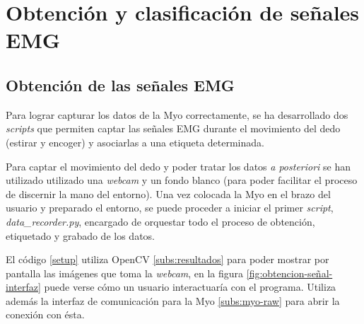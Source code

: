 
\chapter{Obtención y clasificación de señales EMG} %

\label{Chapter4} %







%
%
%
%

\section{Obtención de las señales EMG}
\label{sec:obtención-señales}
Para lograr capturar los datos de la Myo correctamente, se ha desarrollado dos \textit{scripts}
que permiten captar las señales EMG durante el movimiento del dedo (estirar y encoger) y
asociarlas a una etiqueta determinada.

Para captar el movimiento del dedo y poder tratar los datos \textit{a posteriori} se han utilizado
utilizado una \textit{webcam} y un fondo blanco (para poder facilitar el proceso de discernir la
mano del entorno). Una vez colocada la Myo en el brazo del usuario y preparado el entorno,
se puede proceder a iniciar el primer \textit{script}, \textit{data\_recorder.py}, encargado de orquestar
todo el proceso de obtención, etiquetado y grabado de los datos. %

El código \ref{setup} utiliza OpenCV \ref{subs:resultados} para poder mostrar por pantalla las imágenes que toma la
\textit{webcam}, en la figura \ref{fig:obtencion-señal-interfaz} puede verse cómo un usuario interactuaría con el programa. Utiliza además la interfaz de comunicación para la Myo \ref{subs:myo-raw} para abrir la conexión
con ésta.

